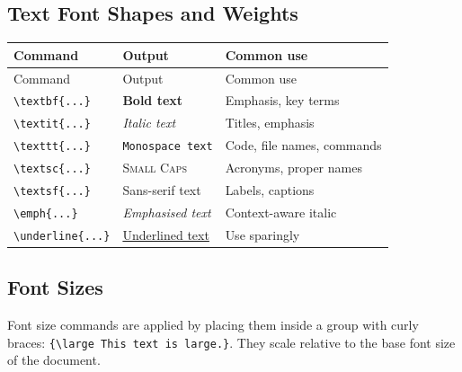 	\subsection{Text Font Shapes and Weights}
	\begin{tabularx}{\linewidth}{@{}lll@{}}
		\caption{Text font commands.}
		\label{tab:fonts-text} \\
		\toprule
		Command & Output & Common use \\
		\midrule
		\endfirsthead
		\toprule
		Command & Output & Common use \\
		\midrule
		\endhead
		\bottomrule
		\endfoot
		\bottomrule
		\endlastfoot
		\texttt{\textbackslash textbf\{...\}}    & \textbf{Bold text}          & Emphasis, key terms \\
		
		\texttt{\textbackslash textit\{...\}}    & \textit{Italic text}        & Titles, emphasis \\
		
		\texttt{\textbackslash texttt\{...\}}    & \texttt{Monospace text}     & Code, file names, commands \\
		
		\texttt{\textbackslash textsc\{...\}}    & \textsc{Small Caps}         & Acronyms, proper names \\
		
		\texttt{\textbackslash textsf\{...\}}    & \textsf{Sans-serif text}    & Labels, captions \\
		
		\texttt{\textbackslash emph\{...\}}      & \emph{Emphasised text}      & Context-aware italic \\
		
		\texttt{\textbackslash underline\{...\}} & \underline{Underlined text} & Use sparingly \\
	\end{tabularx}
	
	\subsection{Font Sizes}
	Font size commands are applied by placing them inside a group with curly braces: \texttt{\{\textbackslash large This text is large.\}}. They scale relative to the base font size of the document.
	
